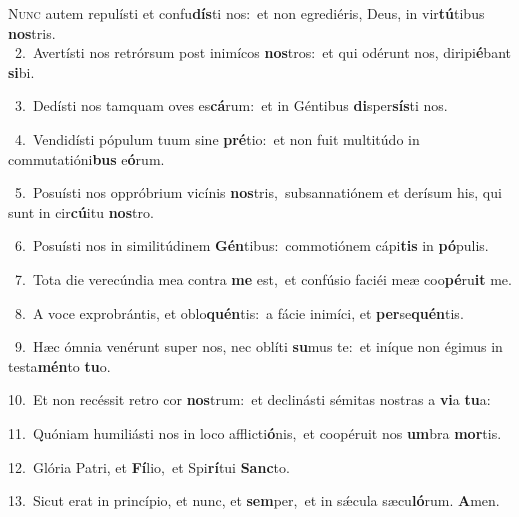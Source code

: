 \lettrine{\initial\textcolor{\initialcolor}{N}}{unc} autem repulísti et confu\-\textbf{dís}\-ti nos:~\star et non egrediéris, Deus, in vir\-\textbf{tú}\-tibus \textbf{nos}\-tris.\\
{\numbfont\textcolor{\numbcolor}{~2.}}~Avertísti nos retrórsum post inimícos \textbf{nos}\-tros:~\star et qui odérunt nos, diripi\-\textbf{é}\-bant \textbf{si}\-bi.\par
{\numbfont\textcolor{\numbcolor}{~3.}}~Dedísti nos tamquam oves es\-\textbf{cá}\-rum:~\star et in Géntibus \textbf{di}\-sper\-\textbf{sís}\-ti nos.\par
{\numbfont\textcolor{\numbcolor}{~4.}}~Vendidísti pópulum tuum sine \textbf{pré}\-tio:~\star et non fuit multitúdo in commutatióni\textbf{bus} e\-\textbf{ó}\-rum.\par
{\numbfont\textcolor{\numbcolor}{~5.}}~Posuísti nos oppróbrium vicínis \textbf{nos}\-tris,~\star subsannatiónem et derísum his, qui sunt in cir\-\textbf{cú}\-itu \textbf{nos}\-tro.\par
{\numbfont\textcolor{\numbcolor}{~6.}}~Posuísti nos in similitúdinem \textbf{Gén}\-tibus:~\star commotiónem cápi\textbf{tis} in \textbf{pó}\-pulis.\par
{\numbfont\textcolor{\numbcolor}{~7.}}~Tota die verecúndia mea contra \textbf{me} est,~\star et confúsio faciéi meæ coo\-\textbf{pé}\-ru\textbf{it} me.\par
{\numbfont\textcolor{\numbcolor}{~8.}}~A voce exprobrántis, et oblo\-\textbf{quén}\-tis:~\star a fácie inimíci, et \textbf{per}\-se\-\textbf{quén}\-tis.\par
{\numbfont\textcolor{\numbcolor}{~9.}}~Hæc ómnia venérunt super nos, nec oblíti \textbf{su}\-mus te:~\star et iníque non égimus in testa\-\textbf{mén}\-to \textbf{tu}\-o.\par
{\numbfont\textcolor{\numbcolor}{10.}}~Et non recéssit retro cor \textbf{nos}\-trum:~\star et declinásti sémitas nostras a \textbf{vi}\-a \textbf{tu}\-a:\par
{\numbfont\textcolor{\numbcolor}{11.}}~Quóniam humiliásti nos in loco afflicti\-\textbf{ó}\-nis,~\star et coopéruit nos \textbf{um}\-bra \textbf{mor}\-tis.\par
{\numbfont\textcolor{\numbcolor}{12.}}~Glória Patri, et \textbf{Fí}\-lio,~\star et Spi\-\textbf{rí}\-tui \textbf{Sanc}\-to.\par
{\numbfont\textcolor{\numbcolor}{13.}}~Sicut erat in princípio, et nunc, et \textbf{sem}\-per,~\star et in sǽcula sæcu\-\textbf{ló}\-rum. \textbf{A}\-men.\par
